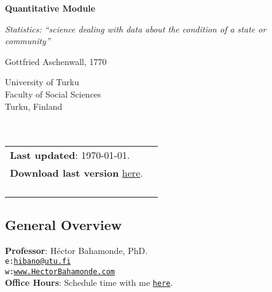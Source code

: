 \documentclass[letterpaper]{article}
\def\name{Quantitative Module}
\begin{document}

\centerline{\huge \bf \name}

\epigraph{\emph{Statistics: ``science dealing with data about the condition of a state or community''}}{Gottfried Aschenwall, 1770}


\vspace{0.25in}

\begin{minipage}{0.45\linewidth}
 University of Turku \\
  Faculty of Social Sciences \\
  Turku, Finland\\
  \\
  \\

\end{minipage}
\hspace{4cm}\begin{minipage}{0.45\linewidth}
  \begin{tabular}{ll}
{\bf Last updated}: \today. \\
 {\bf Download last version} \href{https://github.com/hbahamonde/OLS/raw/master/Bahamonde_OLS.pdf}{here}.%
    \\
    \\
    \\
    \\
    \\
  \end{tabular}
\end{minipage}

\subsection*{General Overview}


\vspace{1mm}
{\bf Professor}: H\'ector Bahamonde, PhD.\\
\texttt{e:}\href{mailto:hibano@utu.fi}{\texttt{hibano@utu.fi}}\\
\texttt{w:}\href{http://www.hectorbahamonde.com}{\texttt{www.HectorBahamonde.com}}\\
{\bf Office Hours}: Schedule time with me \href{https://calendly.com/bahamonde}{\texttt{here}}.\\
\end{document}
